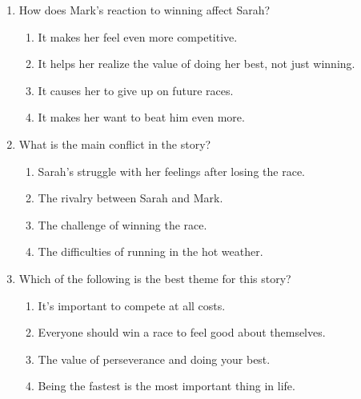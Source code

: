 \documentclass[12pt]{article}
\begin{document}
\begin{enumerate}
\vspace{0.5cm}

\item How does Mark’s reaction to winning affect Sarah?
\begin{enumerate}[label=\Alph*.]
    \item It makes her feel even more competitive.
    \item It helps her realize the value of doing her best, not just winning.
    \item It causes her to give up on future races.
    \item It makes her want to beat him even more.
\end{enumerate}

\vspace{0.5cm}

\item What is the main conflict in the story?
\begin{enumerate}[label=\Alph*.]
    \item Sarah’s struggle with her feelings after losing the race.
    \item The rivalry between Sarah and Mark.
    \item The challenge of winning the race.
    \item The difficulties of running in the hot weather.
\end{enumerate}

\vspace{0.5cm}

\item Which of the following is the best theme for this story?
\begin{enumerate}[label=\Alph*.]
    \item It’s important to compete at all costs.
    \item Everyone should win a race to feel good about themselves.
    \item The value of perseverance and doing your best.
    \item Being the fastest is the most important thing in life.
\end{enumerate}

\end{enumerate}
\end{document}
